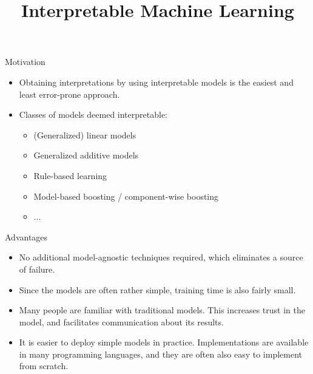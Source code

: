 \documentclass[11pt,compress,t,notes=noshow, aspectratio=169, xcolor=table]{beamer}
\title{Interpretable Machine Learning}
\date{}
\begin{document}
\newcommand{\titlefigure}{figure/whitebox}
\newcommand{\learninggoals}{
\item What characteristics does an interpretable model have?
\item Why should we use interpretable models at all?
\item Examples for interpretable models.}


\begin{vbframe}{Motivation}

    \begin{itemize}
        \item Obtaining interpretations by using interpretable models is the easiest and least error-prone approach.
        \bigskip
        \item Classes of models deemed interpretable:
        \begin{itemize}
            \item (Generalized) linear models
            \item Generalized additive models
            \item Rule-based learning
            \item Model-based boosting / component-wise boosting
            \item ...
        \end{itemize}
    \end{itemize}	
	
\end{vbframe}
	
\begin{vbframe}{Advantages}

    \begin{itemize}
    \itemsep2em
        \item No additional model-agnostic techniques required, which eliminates a source of failure.
        \item Since the models are often rather simple, training time is also fairly small.
        \item Many people are familiar with traditional models. This increases trust in the model, and facilitates communication about its results.
        \item It is easier to deploy simple models in practice. Implementations are available in many programming languages, and they are often also easy to implement from scratch.
    \end{itemize}	
	
\end{vbframe}
\end{document}
